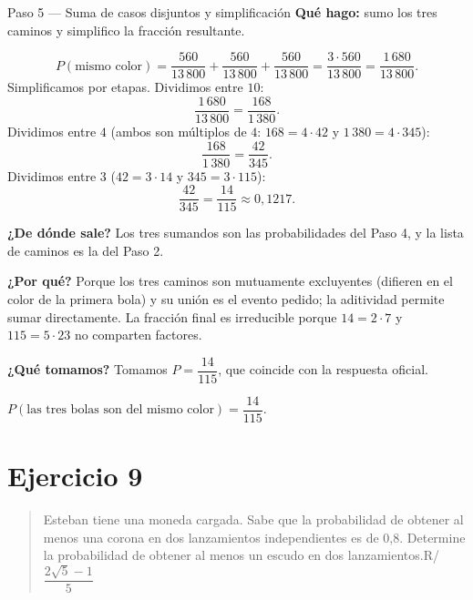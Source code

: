 \documentclass[11pt]{article}
\begin{document}
\begin{paso}{Paso 5 --- Suma de casos disjuntos y simplificación}
\textbf{Qué hago:} sumo los tres caminos y simplifico la fracción resultante.

\[
P(\text{mismo color})=\frac{560}{13\,800}+\frac{560}{13\,800}+\frac{560}{13\,800}
=\frac{3\cdot 560}{13\,800}=\frac{1\,680}{13\,800}.
\]
Simplificamos por etapas. Dividimos entre $10$:
\[
\frac{1\,680}{13\,800}=\frac{168}{1\,380}.
\]
Dividimos entre $4$ (ambos son múltiplos de $4$: $168=4\cdot 42$ y $1\,380=4\cdot 345$):
\[
\frac{168}{1\,380}=\frac{42}{345}.
\]
Dividimos entre $3$ ($42=3\cdot 14$ y $345=3\cdot 115$):
\[
\frac{42}{345}=\frac{14}{115}\approx 0{,}1217 .
\]

\textbf{¿De dónde sale?} Los tres sumandos son las probabilidades del Paso 4, y la lista de caminos es la del Paso 2.

\textbf{¿Por qué?} Porque los tres caminos son mutuamente excluyentes (difieren en el color de la primera bola) y su unión es el evento pedido; la aditividad permite sumar directamente. La fracción final es irreducible porque $14=2\cdot 7$ y $115=5\cdot 23$ no comparten factores.

\textbf{¿Qué tomamos?} Tomamos $P=\dfrac{14}{115}$, que coincide con la respuesta oficial.
\end{paso}

\begin{resp}
$P(\text{las tres bolas son del mismo color})=\dfrac{14}{115}$.
\end{resp}

\section*{Ejercicio 9}

\begin{quote}
Esteban tiene una moneda cargada. Sabe que la probabilidad de obtener al menos una corona en dos lanzamientos independientes es de 0,8. Determine la probabilidad de obtener al menos un escudo en dos lanzamientos.\hfill R/ $\dfrac{2\sqrt{5}-1}{5}$
\end{quote}
\end{document}
